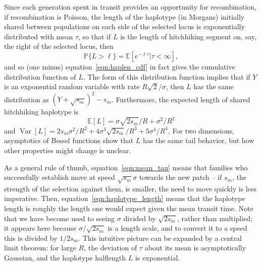 \documentclass{article}
\DeclareMathOperator{\var}{Var}
\renewcommand{\P}{\mathbb{P}}
\newcommand{\E}{\mathbb{E}}
\begin{document}
Since each generation spent in transit provides an opportunity for recombination,
if recombination is Poisson, the length of the haplotype (in Morgans)
initially shared between populations on each side of the selected locus is exponentially distributed
with mean $\tau$, so that if $L$ is the length of hitchhiking segment on, say, the right of
the selected locus, then
\begin{equation} \label{eqn:haplen_cdf2}
\P\{L>\ell\} = \E[e^{-\ell \tau}|\tau<\infty] ,
\end{equation}
and so (one minus) equation~\eqref{eqn:haplen_cdf} in fact gives the cumulative distribution function of $L$.
The form of this distribution function implies that if $Y$ is an exponential random variable with rate $R\sqrt{2}/\sigma$,
then $L$ has the same distribution as $(Y + \sqrt{s_m})^2 - s_m$.
Furthermore, the expected length of shared hitchhiking haplotype is
\begin{equation} \label{eqn:haplotype_length}
\E[L] = \sigma \sqrt{2s_m}/R + \sigma^2/R^2
\end{equation}
and $\var[L] = 2s_m\sigma^2/R^2 + 4 \sigma^3 \sqrt{2s_m}/R^3 + 5 \sigma^4 / R^4$.
For two dimensions, asymptotics of Bessel functions show that $L$ has the same tail behavior,
but how other properties might change is unclear. 

As a general rule of thumb, equation~\eqref{eqn:mean_tau} means that families who successfully establish
move at speed $\sqrt{s_m} \sigma$ towards the new patch 
-- if $s_m$, the strength of the selection against them, is smaller, the need to move quickly is less imperative.
Then, equation~\eqref{eqn:haplotype_length} means that the haplotype length
is roughly the length one would expect given the mean transit time.
Note that we have become used to seeing $\sigma$ divided by $\sqrt{2s_m}$, rather than multiplied;
it appears here because $\sigma/\sqrt{2s_m}$ is a length scale, 
and to convert it to a speed this is divided by $1/2s_m$.
This intuitive picture can be expanded by a central limit theorem:
for large $R$, the deviation of $\tau$ about its mean is asymptotically Gaussian,
and the haplotype halflength $L$ is exponential.

\end{document}

